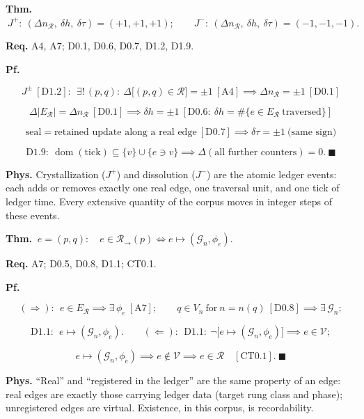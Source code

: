 \begin{theorem}\label{tag:CT0-3}
\textbf{Thm.} $\ J^{+}:\ (\Delta n_{\mathcal R},\ \delta h,\ \delta\tau)=(+1,+1,+1);\qquad J^{-}:\ (\Delta n_{\mathcal R},\ \delta h,\ \delta\tau)=(-1,-1,-1).$

\textbf{Req.} A4, A7; D0.1, D0.6, D0.7, D1.2, D1.9.

\textbf{Pf.}

\[
J^\pm\ [\mathrm{D1.2}]:\ \ \exists!\,(p,q):\ \Delta\bigl[(p,q)\in\mathcal R\bigr]=\pm1\ [\mathrm{A4}]\implies\Delta n_{\mathcal R}=\pm1\ [\mathrm{D0.1}]
\]

\[
\Delta\bigl|E_{\mathcal R}\bigr|=\Delta n_{\mathcal R}\ [\mathrm{D0.1}]\implies\delta h=\pm1\ [\mathrm{D0.6}:\ \delta h=\#\{e\in E_{\mathcal R}\ \text{traversed}\}]
\]

\[
\text{seal}=\text{retained update along a real edge}\ [\mathrm{D0.7}]\implies\delta\tau=\pm1\ \text{(same sign)}
\]

\[
\mathrm{D1.9}:\ \operatorname{dom}(\mathrm{tick})\subseteq\{v\}\cup\{e\ni v\}\implies\Delta(\text{all further counters})=0.\ \blacksquare
\]

\textbf{Phys.} Crystallization ($J^+$) and dissolution ($J^-$) are the atomic ledger events: each adds or removes exactly one real edge, one traversal unit, and one tick of ledger time. Every extensive quantity of the corpus moves in integer steps of these events.

\end{theorem}

\begin{theorem}\label{tag:CT0-4}
\textbf{Thm.} $\ e=(p,q):\quad e\in\mathcal R_{\rightarrow}(p)\iff e\longmapsto(\mathcal G_n,\phi_e).$

\textbf{Req.} A7; D0.5, D0.8, D1.1; CT0.1.

\textbf{Pf.}

\[
(\Rightarrow):\ \ e\in E_{\mathcal R}\implies\exists\,\phi_e\ [\mathrm{A7}];\qquad q\in V_n\ \text{for}\ n=n(q)\ [\mathrm{D0.8}]\implies\exists\,\mathcal G_n;
\]

\[
\mathrm{D1.1}:\ \ e\longmapsto(\mathcal G_n,\phi_e).\qquad
(\Leftarrow):\ \ \mathrm{D1.1}:\ \neg\bigl[e\longmapsto(\mathcal G_n,\phi_e)\bigr]\implies e\in\mathcal V;
\]

\[
e\longmapsto(\mathcal G_n,\phi_e)\implies e\notin\mathcal V\implies e\in\mathcal R\quad[\mathrm{CT0.1}].\ \blacksquare
\]

\textbf{Phys.} “Real” and “registered in the ledger” are the same property of an edge: real edges are exactly those carrying ledger data (target rung class and phase); unregistered edges are virtual. Existence, in this corpus, is recordability.

\end{theorem}

